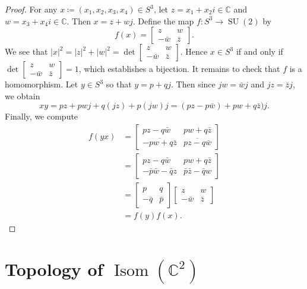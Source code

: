 \documentclass[10pt,letterpaper,cm]{nupset}
\theoremstyle{definition}
\theoremstyle{theorem}
\theoremstyle{remark}
\newcommand{\C}{\mathbb C}
\newcommand{\1}{\mathbf{1}}
\newcommand{\0}{\vec {0}}
\DeclareMathOperator{\Isom}{Isom}
\DeclareMathOperator{\SU}{SU}
\begin{document}
\begin{proof}
For any $x\coloneqq \left(x_1, x_2, x_3, x_4\right) \in S^3$, let $z=x_1+x_2i\in \C$ and $w=x_3+x_4i\in \C$. Then $x=z+wj$. Define the map $f: S^3\to \SU(2)$ by $$f(x)= \begin{bmatrix} z & w\\ {-\bar{w}} & \bar{z} \end{bmatrix}.$$ We see that $|x|^2=|z|^2+|w|^2=\det{\begin{bmatrix} z & w\\ {-\bar{w}} & \bar{z} \end{bmatrix}}$. Hence $x\in S^3$ if and only if $\det{\begin{bmatrix} z & w\\ {-\bar{w}} & \bar{z} \end{bmatrix}}=1$, which establishes a bijection. It remains to check that $f$ is a homomorphism. Let $y\in S^3$ so that $y=p+qj$. Then since $jw=\bar{w}j$ and $jz=\bar{z}j$, we obtain $$xy=pz+pwj+q(jz)+p(jw)j=(pz-p\bar{w})+pw+q\bar{z})j.$$ Finally, we compute 
\begin{align*}
f(yx)& =\begin{bmatrix} {pz-q\bar{w}}&  {pw+q\bar{z}} \\ \overline{-pw+q\bar{z}} & \overline{pz-q\bar{w}} \end{bmatrix}\\ & =\begin{bmatrix} {pz-q\bar{w}}&  {pw+q\bar{z}} \\ {-\bar{p}\bar{w}-\bar{q}{z}} & {\bar{p}\bar{z}-\bar{q}{w}} \end{bmatrix}\\ & =\begin{bmatrix} p & q \\ {-\bar{q}} & \bar{p}\end{bmatrix}\begin{bmatrix} z & w \\ {-\bar{w}} & \bar{z}\end{bmatrix}
\\ & =f(y)f(x).
\end{align*}
\end{proof}

\section{Topology of $\Isom(\C^2)$}
\end{document}
